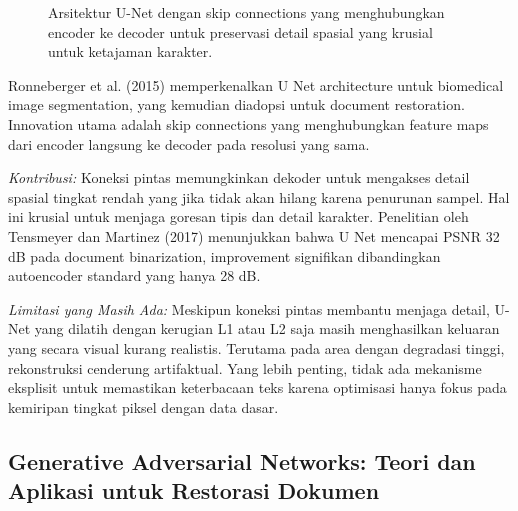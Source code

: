 \documentclass[12pt,a4paper]{article}
\begin{document}
\begin{figure}[H]
\centering
\caption{Arsitektur U-Net dengan skip connections yang menghubungkan encoder ke decoder untuk preservasi detail spasial yang krusial untuk ketajaman karakter.}
\label{fig:unet-architecture}
\end{figure}

Ronneberger et al. (2015) memperkenalkan U Net architecture untuk biomedical image segmentation, yang kemudian diadopsi untuk document restoration. Innovation utama adalah skip connections yang menghubungkan feature maps dari encoder langsung ke decoder pada resolusi yang sama.

\textit{Kontribusi:} Koneksi pintas memungkinkan dekoder untuk mengakses detail spasial tingkat rendah yang jika tidak akan hilang karena penurunan sampel. Hal ini krusial untuk menjaga goresan tipis dan detail karakter. Penelitian oleh Tensmeyer dan Martinez (2017) menunjukkan bahwa U Net mencapai PSNR 32 dB pada document binarization, improvement signifikan dibandingkan autoencoder standard yang hanya 28 dB.

\textit{Limitasi yang Masih Ada:} Meskipun koneksi pintas membantu menjaga detail, U-Net yang dilatih dengan kerugian L1 atau L2 saja masih menghasilkan keluaran yang secara visual kurang realistis. Terutama pada area dengan degradasi tinggi, rekonstruksi cenderung artifaktual. Yang lebih penting, tidak ada mekanisme eksplisit untuk memastikan keterbacaan teks karena optimisasi hanya fokus pada kemiripan tingkat piksel dengan data dasar.

\subsection{Generative Adversarial Networks: Teori dan Aplikasi untuk Restorasi Dokumen}
\label{subsec:gan-theory}
\end{document}
